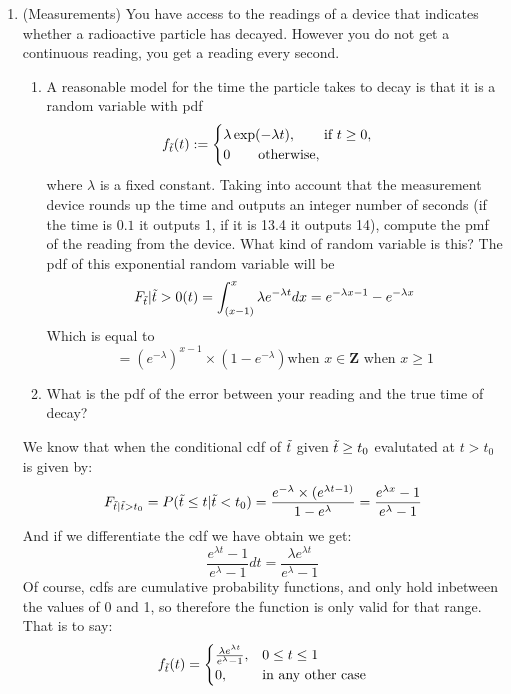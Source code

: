 \documentclass[12pt,twoside]{article}
\begin{document}
\begin{enumerate}
\item (Measurements)  
You have access to the readings of a device that indicates whether a radioactive particle has decayed. However you do not get a continuous reading, you get a reading every second. 
\begin{enumerate}
\item A reasonable model for the time the particle takes to decay is that it is a random variable with pdf
\begin{align}
f_{\tilde{ t }}(t) := \begin{cases}
\lambda \exp(- \lambda t), \qquad \text{if $t\geq 0$},\\
0 \qquad \text{otherwise},
\end{cases}
\end{align}
where $\lambda$ is a fixed constant. Taking into account that the measurement device rounds up the time and outputs an integer number of seconds (if the time is $0.1$ it outputs 1, if it is 13.4 it outputs 14), compute the pmf of the reading from the device. What kind of random variable is this? 
\subitem 
The pdf of this exponential random variable will be
$$
    F_{\tilde{ t }} | \tilde{ t }>0 (t) = \int_{(x-1)}^{x} \lambda e^{-\lambda t}dx = e^{-\lambda x-1}   - e^{-\lambda x}
$$
Which is equal to 
$$
    = (e^{-\lambda})^{x-1} \times (1-e^{-\lambda}) \text{when } x\in \mathbf{Z} \text{ when } x \geq 1
$$
\item What is the pdf of the error between your reading and the true time of decay?
\end{enumerate}
We know that when the conditional cdf of $\tilde{ t }$ given $\tilde{ t } \geq t_{0}$ evalutated at $t > t_{0}$ is given by:
$$
    F_{\tilde{ t }|\tilde{ t }>t_{0}} = P(\tilde{ t }\leq t | \tilde{ t } < t_0) = \frac{ e^{-\lambda }\times (e^{\lambda t -1)}}{1-e^{\lambda}} = \frac{e^{\lambda x}-1}{e^{\lambda}-1} 
$$
And if we differentiate the cdf we have obtain we get:
$$
    \frac{e^{\lambda t}-1}{e^{\lambda}-1}dt = \frac{\lambda e^{\lambda t}}{e^{\lambda} -1} 
$$
Of course, cdfs are cumulative probability functions, and only hold inbetween the values of 0 and 1, so therefore the function is only valid for that range. That is to say:
$$
    f_{\tilde{ t }}(t) =  \begin{cases} 
      \frac{\lambda e^{\lambda t}}{e^{\lambda}-1}, & 0 \leq t \leq 1 \\
      0, & \text{in any other case}
   \end{cases}
$$


\end{enumerate}
\end{document}
